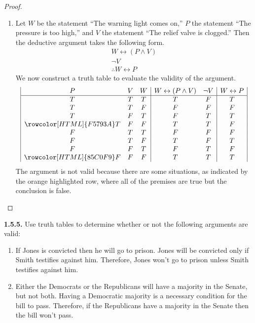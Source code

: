 \documentclass[12pt]{amsart}
\newenvironment{statement}[1]{\smallskip\noindent\color[rgb]{.6627, .3529, .6314} {\bf #1.}}{}
\theoremstyle{definition}
\theoremstyle{remark}
\begin{document}
\begin{proof}
\begin{enumerate}
	\item Let $W$ be the statement ``The warning light comes on,'' $P$ the statement ``The pressure is too high,'' and $V$ the statement ``The relief valve is clogged.''
	Then the deductive argument takes the following form.
	\begin{equation*}
		\begin{array}{l}
			W \leftrightarrow (P \wedge V) \\
			\neg V \\
			\hline
			\therefore W \leftrightarrow P
		\end{array}
	\end{equation*}
	We now construct a truth table to evaluate the validity of the argument.
	\begin{equation*}
		\begin{array}{| c c c | c c | c |}
			P & V & W & W \leftrightarrow (P \wedge V) & \neg V & W \leftrightarrow P \\
			\hline
			T & T & T & T & F & T \\
			T & T & F & F & F & F \\
			T & F & T & F & T & T \\
			\rowcolor[HTML]{F5793A} T & F & F & T & T & F \\
			F & T & T & F & F & F\\
			F & T & F & T & F & T \\
			F & F & T & F & T & F \\
			\rowcolor[HTML]{85C0F9} F & F & F & T & T & T
		\end{array}
	\end{equation*}
	The argument is not valid because there are some situations, as indicated by the orange highlighted row, where all of the premises are true but the conclusion is false.
\end{enumerate}
\end{proof}


\begin{statement}{1.5.5}
Use truth tables to determine whether or not the following arguments are valid:
\begin{enumerate}
	\item If Jones is convicted then he will go to prison.
	Jones will be convicted only if Smith testifies against him.
	Therefore, Jones won't go to prison unless Smith testifies against him.
	
	\item Either the Democrats or the Republicans will have a majority in the Senate, but not both.
	Having a Democratic majority is a necessary condition for the bill to pass.
	Therefore, if the Republicans have a majority in the Senate then the bill won't pass.
\end{enumerate}
\end{statement}
\end{document}
